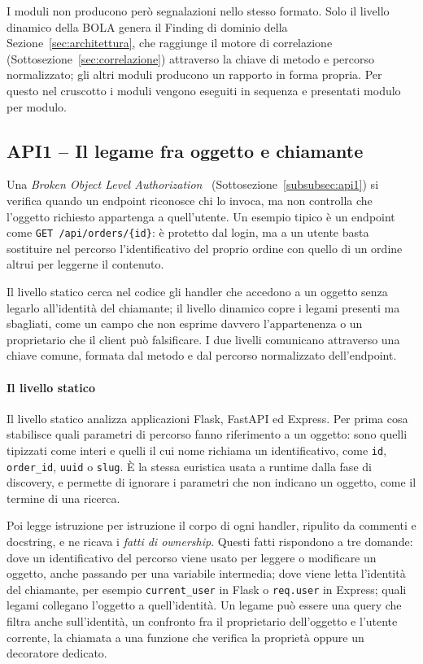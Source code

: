 I moduli non producono però segnalazioni nello stesso formato. Solo il livello
dinamico della BOLA genera il Finding di dominio della
Sezione~\ref{sec:architettura}, che raggiunge il motore di correlazione
(Sottosezione~\ref{sec:correlazione}) attraverso la chiave di metodo e percorso
normalizzato; gli altri moduli producono un rapporto in forma propria. Per
questo nel cruscotto i moduli vengono eseguiti in sequenza e presentati modulo
per modulo.

\subsection{API1 -- Il legame fra oggetto e chiamante}
\label{sec:rilevamento-bola}

Una \emph{Broken Object Level Authorization}~\cite{owasp2023api1}
(Sottosezione~\ref{subsubsec:api1}) si verifica quando un endpoint riconosce chi
lo invoca, ma non controlla che l'oggetto richiesto appartenga a quell'utente. Un esempio tipico è un
endpoint come \texttt{GET /api/orders/\{id\}}: è protetto dal login, ma a un
utente basta sostituire nel percorso l'identificativo del proprio ordine con
quello di un ordine altrui per leggerne il contenuto.

Il livello statico cerca nel codice gli handler che accedono a un oggetto
senza legarlo all'identità del chiamante; il livello dinamico copre i legami
presenti ma sbagliati, come un campo che non esprime davvero l'appartenenza o
un proprietario che il client può falsificare. I due livelli comunicano
attraverso una chiave comune, formata dal metodo e dal percorso normalizzato
dell'endpoint.

\paragraph{Il livello statico}
Il livello statico analizza applicazioni Flask, FastAPI ed Express. Per prima
cosa stabilisce quali parametri di percorso fanno riferimento a un oggetto:
sono quelli tipizzati come interi e quelli il cui nome richiama un
identificativo, come \texttt{id}, \texttt{order\_id}, \texttt{uuid} o
\texttt{slug}. È la stessa euristica usata a runtime dalla fase di discovery, e
permette di ignorare i parametri che non indicano un oggetto, come il termine
di una ricerca.

Poi legge istruzione per istruzione il corpo di ogni handler, ripulito da
commenti e docstring, e ne ricava i \emph{fatti di ownership}. Questi fatti
rispondono a tre domande: dove un identificativo del percorso viene usato per
leggere o modificare un oggetto, anche passando per una variabile intermedia;
dove viene letta l'identità del chiamante, per esempio \texttt{current\_user}
in Flask o \texttt{req.user} in Express; quali legami collegano l'oggetto a
quell'identità. Un legame può essere una query che filtra anche sull'identità,
un confronto fra il proprietario dell'oggetto e l'utente corrente, la chiamata
a una funzione che verifica la proprietà oppure un decoratore dedicato.

